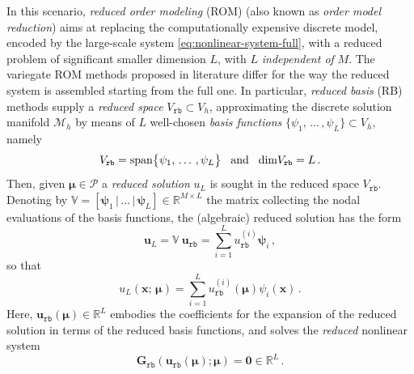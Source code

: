 \documentclass[12pt, a4paper, twoside, openright]{report}
\numberwithin{equation}{chapter}
\theoremstyle{theorem}
\theoremstyle{definition}
\theoremstyle{remark}
\theoremstyle{proposition}
\numberwithin{figure}{chapter}
\newcommand{\bg}[1]{\boldsymbol{#1}}
\begin{document}
		In this scenario, \emph{reduced order modeling} (ROM) (also known as \emph{order model reduction}) aims at replacing the computationally expensive discrete model, encoded by the large-scale system \eqref{eq:nonlinear-system-full}, with a reduced problem of significant smaller dimension $L$, with $L$ \emph{independent of} $M$. The variegate ROM methods proposed in literature differ for the way the reduced system is assembled starting from the full one. In particular, \emph{reduced basis} (RB) methods supply a \emph{reduced space} $V_{\texttt{rb}} \subset V_h$, approximating the discrete solution manifold $\mathcal{M}_h$ by means of $L$ well-chosen \emph{basis functions} $\big\lbrace \psi_1, \, \ldots \, , \psi_L \big\rbrace \subset V_h$, namely
		\begin{equation*}
			V_{\texttt{rb}} = \text{span}\big\lbrace \psi_1, \, \ldots \, , \psi_L \big\rbrace \hspace*{0.3cm} \text{and} \hspace*{0.3cm} \text{dim} V_{\texttt{rb}} = L \, .
		\end{equation*}
		Then, given $\boldsymbol{\mu} \in \mathcal{P}$ a \emph{reduced solution} $u_L$ is sought in the reduced space $V_{\texttt{rb}}$. Denoting by $\mathbb{V} = [\bg{\psi}_1 \, \big| \, \ldots \, \big| \, \bg{\psi}_L] \in \mathbb{R}^{M \times L}$ the matrix collecting the nodal evaluations of the basis functions, the (algebraic) reduced solution has the form
		\begin{equation}
			\label{eq:reduced-solution-algebraic}
			\mathbf{u}_L = \mathbb{V} ~ \mathbf{u}_{\texttt{rb}} = \sum_{i = 1}^L u_{\texttt{rb}}^{(i)} \bg{\psi}_i \, ,
		\end{equation}
		so that
		\begin{equation}
			\label{eq:reduced-solution}
			u_L(\bg{x}; \, \bg{\mu}) = \sum_{i = 1}^L u_{\texttt{rb}}^{(i)}(\bg{\mu}) \psi_i(\bg{x}) \, .
		\end{equation}
		Here, $\mathbf{u}_{\texttt{rb}}(\boldsymbol{\mu}) \in \mathbb{R}^L$ embodies the coefficients for the expansion of the reduced solution in terms of the reduced basis functions, and solves the \emph{reduced} nonlinear system
		\begin{equation}
			\label{eq:nonlinear-system-reduced}
			\boldsymbol{G}_{\texttt{rb}}(\mathbf{u}_{\texttt{rb}}(\boldsymbol{\mu}); \boldsymbol{\mu}) = \boldsymbol{0} \in \mathbb{R}^L \, .
		\end{equation}
\end{document}
